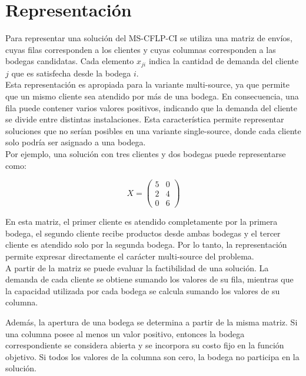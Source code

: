 \section{Representación}

\noindent Para representar una solución del MS-CFLP-CI se utiliza una matriz de envíos, cuyas filas corresponden a los clientes y cuyas columnas corresponden a las bodegas candidatas. Cada elemento \(x_{ji}\) indica la cantidad de demanda del cliente \(j\) que es satisfecha desde la bodega \(i\).\\

\noindent Esta representación es apropiada para la variante multi-source, ya que permite que un mismo cliente sea atendido por más de una bodega. En consecuencia, una fila puede contener varios valores positivos, indicando que la demanda del cliente se divide entre distintas instalaciones. Esta característica permite representar soluciones que no serían posibles en una variante single-source, donde cada cliente solo podría ser asignado a una bodega.\\

\noindent Por ejemplo, una solución con tres clientes y dos bodegas puede representarse como:

\[
X =
\begin{pmatrix}
5 & 0 \\
2 & 4 \\
0 & 6
\end{pmatrix}
\]

\noindent En esta matriz, el primer cliente es atendido completamente por la primera bodega, el segundo cliente recibe productos desde ambas bodegas y el tercer cliente es atendido solo por la segunda bodega. Por lo tanto, la representación permite expresar directamente el carácter multi-source del problema.\\

\noindent A partir de la matriz se puede evaluar la factibilidad de una solución. La demanda de cada cliente se obtiene sumando los valores de su fila, mientras que la capacidad utilizada por cada bodega se calcula sumando los valores de su columna. 

\noindent Además, la apertura de una bodega se determina a partir de la misma matriz. Si una columna posee al menos un valor positivo, entonces la bodega correspondiente se considera abierta y se incorpora su costo fijo en la función objetivo. Si todos los valores de la columna son cero, la bodega no participa en la solución.\\

